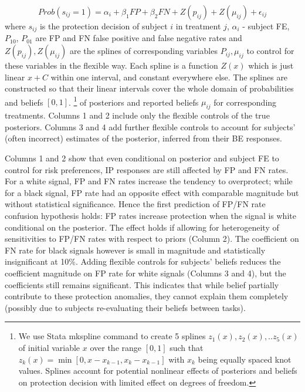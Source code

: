 \documentclass[12pt,a4paper]{article}
\begin{document}
	\[Prob(s_{ij}=1)=\alpha_i+\beta_1 FP +\beta_2 FN +Z(p_{ij})+Z(\mu_{ij})+\epsilon_{ij} \]
where $s_{ij}$ is the protection decision of subject $i$ in treatment $j$, $\alpha_i$ - subject FE, $P_{10}$, $P_{01}$ are FP and FN false positive and false negative rates and $Z(p_{ij}),Z(\mu_{ij})$ are the splines of corresponding variables $P_{ij}, \mu_{ij}$ to control for these variables in the flexible way. Each spline is a function $Z(x)$ which is just linear $x+C$ within one interval, and constant everywhere else. The splines are constructed so that their linear intervals cover the whole domain of probabilities and beliefs $[0,1]$.  \footnote{We use Stata mkspline command to create 5 splines $z_1(x),z_2(x),..z_5(x)$ of initial variable $x$ over the range $[0,1]$ such that $z_k(x)=\min[0,x-x_{k-1},x_k-x_{k-1}]$ with $x_k$ being equally spaced knot values. Splines account for potential nonlinear effects of posteriors and beliefs on protection decision with limited effect on degrees of freedom.} of posteriors and reported beliefs $\mu_{ij}$ for corresponding treatments. Columns 1 and 2 include only the flexible controls of the true posteriors. Columns 3 and 4 add further flexible controls to account for subjects' (often incorrect) estimates of the posterior, inferred from their BE responses.

Columns 1 and 2 show that even conditional on posterior and subject FE to control for risk preferences, IP responses are still affected by FP and FN rates. For a white signal, FP and FN rates increase the tendency to overprotect; while for a black signal, FP rate had an opposite effect with comparable magnitude but without statistical significance. Hence the first prediction of FP/FN rate confusion hypothesis holds: FP rates increase protection when the signal is white conditional on the posterior. The effect holds if allowing for heterogeneity of sensitivities to FP/FN rates with respect to priors (Column 2). The coefficient on FN rate for black signals however is small in magnitude and statistically insignificant at 10\%. Adding flexible controls for subjects' beliefs reduces the coefficient magnitude on FP rate for white signals (Columns 3 and 4), but the coefficients still remains significant. This indicates that while belief partially contribute to these protection anomalies, they cannot explain them completely (possibly due to subjects re-evaluating their beliefs between tasks). 
\end{document}
